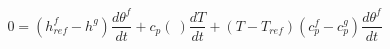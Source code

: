 \begin{equation}
0= (h_{ref}^f-h^g) \frac{d\theta^f }{dt} + c_p(\ ) \frac{d T}{dt} +  (T- T_{ref}) (c_p^f-c_p^g) \frac{d\theta^f }{dt}
\end{equation}